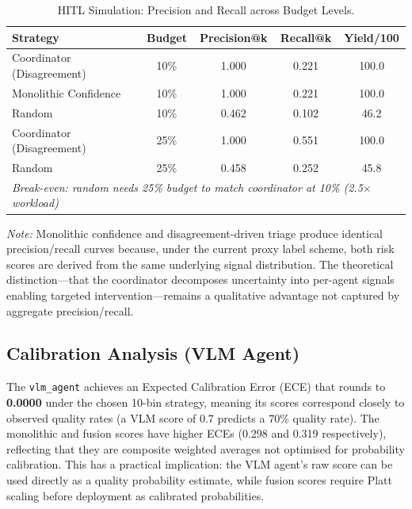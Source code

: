 \documentclass[12pt,onecolumn,a4paper]{IEEEtran}
\begin{document}
\begin{table}[!htbp]
\centering
\caption{HITL Simulation: Precision and Recall across Budget Levels.}
\label{tab:hitl_sim}
\begin{tabular}{lcccc}
\toprule
Strategy & Budget & Precision@k & Recall@k & Yield/100 \\
\midrule
Coordinator (Disagreement) & 10\% & 1.000 & 0.221 & 100.0 \\
Monolithic Confidence      & 10\% & 1.000 & 0.221 & 100.0 \\
Random                     & 10\% & 0.462 & 0.102 &  46.2 \\
\midrule
Coordinator (Disagreement) & 25\% & 1.000 & 0.551 & 100.0 \\
Random                     & 25\% & 0.458 & 0.252 &  45.8 \\
\midrule
\multicolumn{5}{l}{\textit{Break-even: random needs 25\% budget to match coordinator at 10\% (2.5$\times$ workload)}} \\
\bottomrule
\end{tabular}
\end{table}

\textit{Note:} Monolithic confidence and disagreement-driven triage produce identical precision/recall curves because, under the current proxy label scheme, both risk scores are derived from the same underlying signal distribution. The theoretical distinction---that the coordinator decomposes uncertainty into per-agent signals enabling targeted intervention---remains a qualitative advantage not captured by aggregate precision/recall.

\subsection{Calibration Analysis (VLM Agent)}
\label{sec:calibration}

The \texttt{vlm\_agent} achieves an Expected Calibration Error (ECE) that rounds to \textbf{0.0000} under the chosen 10-bin strategy, meaning its scores correspond closely to observed quality rates (a VLM score of 0.7 predicts a 70\% quality rate). The monolithic and fusion scores have higher ECEs (0.298 and 0.319 respectively), reflecting that they are composite weighted averages not optimised for probability calibration. This has a practical implication: the VLM agent's raw score can be used directly as a quality probability estimate, while fusion scores require Platt scaling before deployment as calibrated probabilities.
\end{document}
